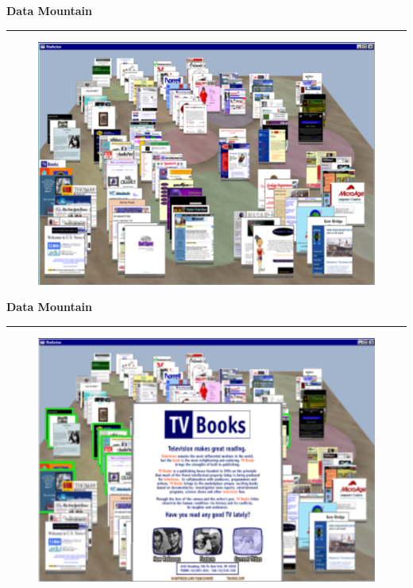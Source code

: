 \documentclass[pdf]{beamer}
\begin{document}
\begin{frame}
{\textbf{Data Mountain}}{\textcolor{red}{\rule{12cm}{1.2pt}}}

\begin{figure}
\includegraphics[scale=0.45]{41_Picture2.png}
\end{figure}

\end{frame}



\begin{frame}
{\textbf{Data Mountain}}{\textcolor{red}{\rule{12cm}{1.2pt}}}

\begin{figure}
\includegraphics[scale=0.45]{41_Picture1.png}
\end{figure}

\end{frame}
\end{document}
